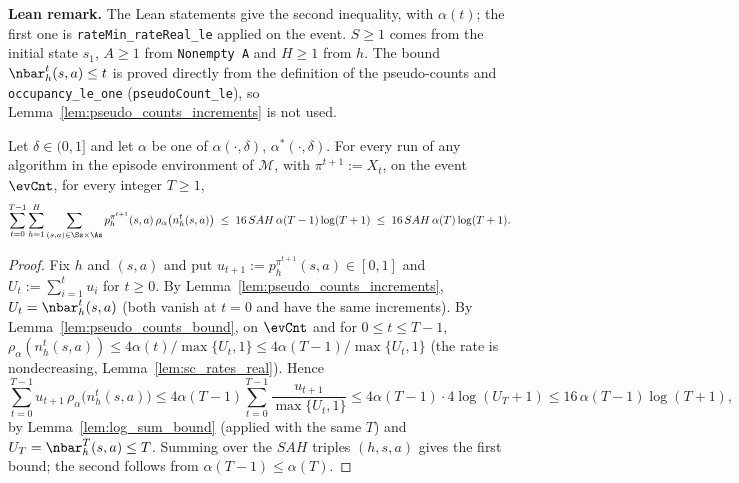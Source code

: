 \textbf{Lean remark.} The Lean statements give the second inequality, with $\alpha(t)$; the first
one is \texttt{rateMin\_rateReal\_le} applied on the event. $S \ge 1$ comes from the initial state $s_1$,
$A \ge 1$ from \texttt{Nonempty A} and $H \ge 1$ from $h$. The bound $\nbar_h^t(s,a) \le t$ is proved
directly from the definition of the pseudo-counts and \texttt{occupancy\_le\_one}
(\texttt{pseudoCount\_le}), so Lemma~\ref{lem:pseudo_counts_increments} is not used.

\begin{lemma}\label{lem:sum_counts_bound}
\leanok
Let $\delta \in (0,1]$ and let $\alpha$ be one of $\alpha(\cdot,\delta)$, $\alpha^*(\cdot,\delta)$.
For every run of any algorithm in the episode environment of $\mathcal M$, with
$\pi^{t+1} := X_t$, on the event $\evCnt$, for every integer $T \ge 1$,
\[
  \sum_{t=0}^{T-1}\sum_{h=1}^H\sum_{(s,a)\in\Ss\times\As} p^{\pi^{t+1}}_h(s,a)\,\rho_\alpha\big(n_h^t(s,a)\big)
  \;\le\; 16\, S A H\, \alpha(T-1)\log(T+1) \;\le\; 16\, SAH\,\alpha(T)\log(T+1) .
\]
\end{lemma}

\begin{proof}
\leanok
{}
Fix $h$ and $(s,a)$ and put $u_{t+1} := p^{\pi^{t+1}}_h(s,a) \in [0,1]$ and
$U_t := \sum_{i=1}^t u_i$ for $t \ge 0$. By Lemma~\ref{lem:pseudo_counts_increments},
$U_t = \nbar_h^t(s,a)$ (both vanish at $t = 0$ and have the same increments). By
Lemma~\ref{lem:pseudo_counts_bound}, on $\evCnt$ and for $0 \le t \le T-1$,
$\rho_\alpha(n_h^t(s,a)) \le 4\alpha(t)/\max\{U_t,1\} \le 4\alpha(T-1)/\max\{U_t,1\}$ (the rate
is nondecreasing, Lemma~\ref{lem:sc_rates_real}). Hence
\[
  \sum_{t=0}^{T-1} u_{t+1}\,\rho_\alpha\big(n_h^t(s,a)\big) \le 4\alpha(T-1)\sum_{t=0}^{T-1}\frac{u_{t+1}}{\max\{U_t,1\}}
  \le 4\alpha(T-1)\cdot 4\log(U_T + 1) \le 16\,\alpha(T-1)\log(T+1),
\]
by Lemma~\ref{lem:log_sum_bound} (applied with the same $T$) and
$U_T = \nbar_h^T(s,a) \le T$. Summing over the $SAH$ triples $(h, s, a)$ gives the first bound;
the second follows from $\alpha(T-1) \le \alpha(T)$.
\end{proof}

